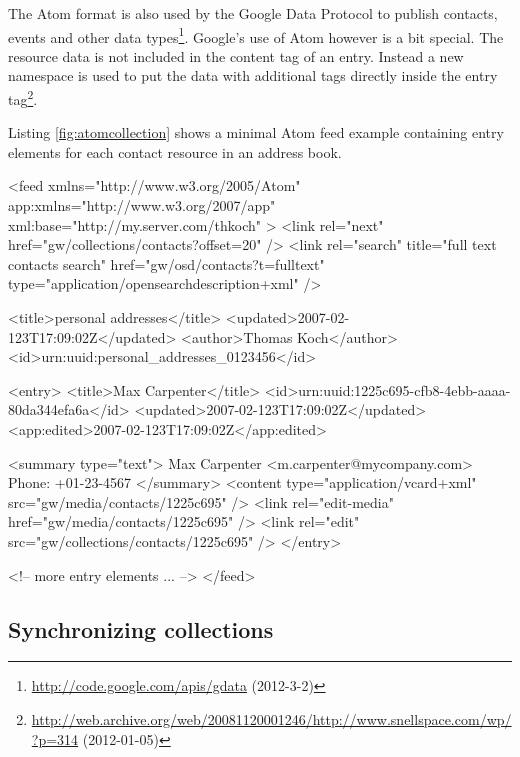 \documentclass[11pt,a4paper,headsepline,twoside]{scrartcl}		%
\newcommand{\citeurl}[2]{\url{#1} (#2)}
\begin{document}
The Atom format is also used by the Google Data Protocol to publish contacts,
events and other data
types\footnote{\citeurl{http://code.google.com/apis/gdata}{2012-3-2}}. Google's
use of Atom however is a bit special. The resource data is not included in the
content tag of an entry. Instead a new namespace is used to put the data with
additional tags directly inside the entry
tag\footnote{\citeurl{http://web.archive.org/web/20081120001246/http://www.snellspace.com/wp/?p=314}{2012-01-05}}.

Listing \ref{fig:atomcollection} shows a minimal Atom feed example containing
entry elements for each contact resource in an address book.


\begin{anylisting}[language=xml,
                   label=fig:atomcollection,
                   caption={An Atom feed representing an address book collection}]
<feed xmlns="http://www.w3.org/2005/Atom"
      app:xmlns="http://www.w3.org/2007/app"
      xml:base="http://my.server.com/thkoch" >
 <link rel="next" href="gw/collections/contacts?offset=20" />
 <link rel="search" title="full text contacts search"
       href="gw/osd/contacts?t=fulltext" 
       type="application/opensearchdescription+xml" />

 <title>personal addresses</title>
 <updated>2007-02-123T17:09:02Z</updated>
 <author>Thomas Koch</author>
 <id>urn:uuid:personal_addresses_0123456</id>

 <entry>
  <title>Max Carpenter</title>
  <id>urn:uuid:1225c695-cfb8-4ebb-aaaa-80da344efa6a</id>
  <updated>2007-02-123T17:09:02Z</updated>
  <app:edited>2007-02-123T17:09:02Z</app:edited>

  <summary type="text">
    Max Carpenter <m.carpenter@mycompany.com>
    Phone: +01-23-4567
  </summary>
  <content type="application/vcard+xml"
     src="gw/media/contacts/1225c695" />
  <link rel="edit-media"
     href="gw/media/contacts/1225c695" />
  <link rel="edit"
     src="gw/collections/contacts/1225c695" />
 </entry>

 <!-- more entry elements ... -->
</feed>
\end{anylisting}

\subsection{Synchronizing collections}
\label{sec:synchr-coll}
\end{document}
